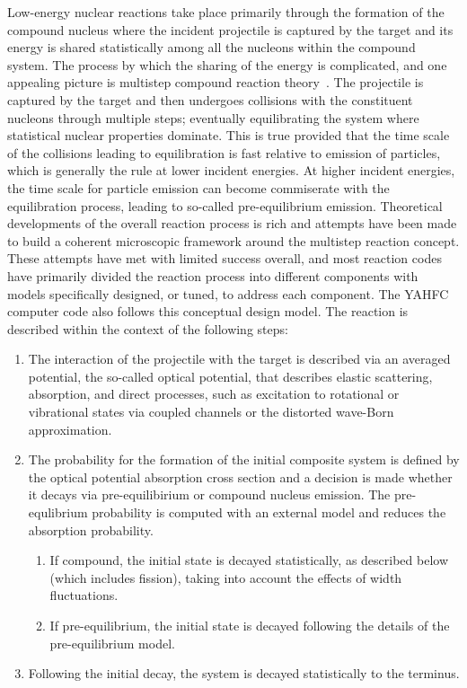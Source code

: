 \documentclass[
10pt,
showpacs,preprintnumbers,footinbib,
amsfonts,amsmath,amssymb,
aps,
prc,twocolumn,groupedaddress,superscriptaddress,
showkeys,
nofootinbib
]{revtex4-1}
\begin{document}
Low-energy nuclear reactions take place primarily through the formation of the compound nucleus where the incident projectile is captured by the target and its energy is shared statistically among all the nucleons within the compound system. The process by which the sharing of the energy is complicated, and one appealing picture is multistep compound reaction theory~\cite{Feshbach:1980}. The projectile is captured by the target and then undergoes collisions with the constituent nucleons through multiple steps; eventually equilibrating the system where statistical nuclear properties dominate. This is true provided that the time scale of the collisions leading to equilibration is fast relative to emission of particles, which is generally the rule at lower incident energies. At higher incident energies, the time scale for particle emission can become commiserate with the equilibration process, leading to so-called pre-equilibrium emission. Theoretical developments of the overall reaction process is rich and attempts have been made to build a coherent microscopic framework around the multistep reaction concept. These attempts have met with limited success overall, and most reaction codes have primarily divided the reaction process into different components with models specifically designed, or tuned, to address each component. The YAHFC computer code also follows this conceptual design model. The reaction is described within the context of the following steps:
\begin{enumerate}
\item The interaction of the projectile with the target is described via an averaged potential, the so-called optical potential, that describes elastic scattering, absorption, and direct processes, such as excitation to rotational or vibrational states via coupled channels or the distorted wave-Born approximation.
\item The probability for the formation of the initial composite system is defined by the optical potential absorption cross section and a decision is made whether it decays via pre-equilibirium or compound nucleus emission. The pre-equlibrium probability is computed with an external model and reduces the absorption probability.
\begin{enumerate} 
\item If compound, the initial state is decayed statistically, as described below (which includes fission), taking into account the effects of width fluctuations.
\item If pre-equilibrium, the initial state is decayed following the details of the pre-equilibrium model.
\end{enumerate}
\item Following the initial decay, the system is decayed statistically to the terminus.
\end{enumerate}
\end{document}
